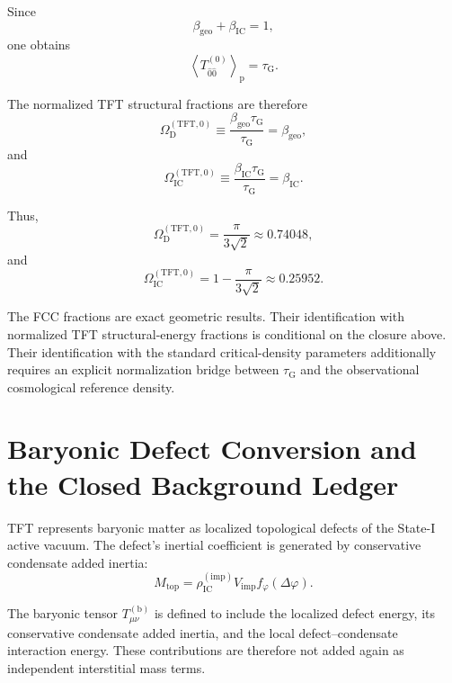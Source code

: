 Since
\begin{equation}
    \beta_{\mathrm{geo}} + \beta_{\mathrm{IC}} = 1,
\end{equation}
one obtains
\begin{equation}
    \left\langle T_{\hat{0}\hat{0}}^{(0)} \right\rangle_{\mathrm{p}} = \tau_{\mathrm{G}}.
\end{equation}

The normalized TFT structural fractions are therefore
\begin{equation}
    \Omega_{\mathrm{D}}^{(\mathrm{TFT},0)} \equiv \frac{\beta_{\mathrm{geo}}\tau_{\mathrm{G}}} {\tau_{\mathrm{G}}} = \beta_{\mathrm{geo}},
\end{equation}
and
\begin{equation}
    \Omega_{\mathrm{IC}}^{(\mathrm{TFT},0)} \equiv \frac{\beta_{\mathrm{IC}}\tau_{\mathrm{G}}} {\tau_{\mathrm{G}}} = \beta_{\mathrm{IC}}.
\end{equation}

Thus,
\begin{equation}
    \Omega_{\mathrm{D}}^{(\mathrm{TFT},0)} = \frac{\pi}{3\sqrt{2}} \approx 0.74048,
\end{equation}
and
\begin{equation}
    \Omega_{\mathrm{IC}}^{(\mathrm{TFT},0)} = 1-\frac{\pi}{3\sqrt{2}} \approx 0.25952.
\end{equation}

The FCC fractions are exact geometric results. Their identification with normalized TFT structural-energy fractions is conditional on the closure above. Their identification with the standard critical-density parameters additionally requires an explicit normalization bridge between $\tau_{\mathrm{G}}$ and the observational cosmological reference density.

\section{Baryonic Defect Conversion and the Closed Background Ledger}

TFT represents baryonic matter as localized topological defects of the State-I active vacuum. The defect's inertial coefficient is generated by conservative condensate added inertia:
\begin{equation}
    M_{\mathrm{top}} = \rho_{\mathrm{IC}}^{(\mathrm{imp})} V_{\mathrm{imp}} f_{\varphi}(\Delta\varphi).
\end{equation}

The baryonic tensor $T_{\mu\nu}^{(\mathrm{b})}$ is defined to include the localized defect energy, its conservative condensate added inertia, and the local defect--condensate interaction energy. These contributions are therefore not added again as independent interstitial mass terms.

